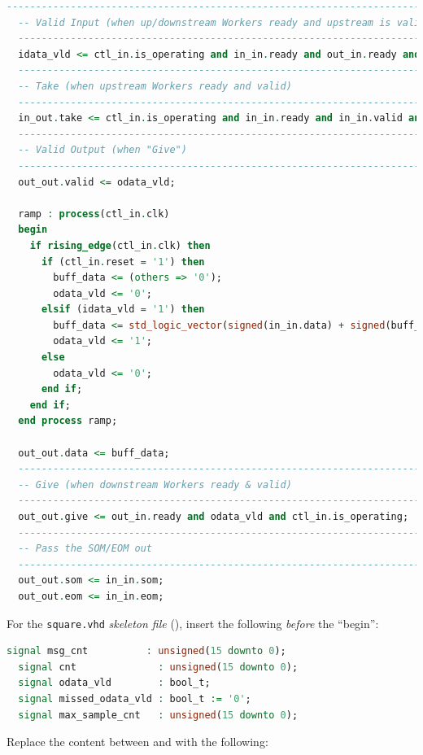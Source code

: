 \begin{lstlisting}[language=vhdl, columns=fullflexible, breaklines=true, prebreak=\textbackslash, basicstyle=\ttfamily, showstringspaces=false, upquote=true]
  -----------------------------------------------------------------------------
  -- Valid Input (when up/downstream Workers ready and upstream is valid
  -----------------------------------------------------------------------------
  idata_vld <= ctl_in.is_operating and in_in.ready and out_in.ready and in_in.valid;
  -----------------------------------------------------------------------------
  -- Take (when upstream Workers ready and valid)
  -----------------------------------------------------------------------------
  in_out.take <= ctl_in.is_operating and in_in.ready and in_in.valid and out_in.ready;
  -----------------------------------------------------------------------------
  -- Valid Output (when "Give")
  -----------------------------------------------------------------------------
  out_out.valid <= odata_vld;

  ramp : process(ctl_in.clk)
  begin
    if rising_edge(ctl_in.clk) then
      if (ctl_in.reset = '1') then
        buff_data <= (others => '0');
        odata_vld <= '0';
      elsif (idata_vld = '1') then
        buff_data <= std_logic_vector(signed(in_in.data) + signed(buff_data));
        odata_vld <= '1';
      else
        odata_vld <= '0';
      end if;
    end if;
  end process ramp;

  out_out.data <= buff_data;
  -----------------------------------------------------------------------------
  -- Give (when downstream Workers ready & valid)
  -----------------------------------------------------------------------------
  out_out.give <= out_in.ready and odata_vld and ctl_in.is_operating;
  -----------------------------------------------------------------------------
  -- Pass the SOM/EOM out
  -----------------------------------------------------------------------------
  out_out.som <= in_in.som;
  out_out.eom <= in_in.eom;
\end{lstlisting}

\bstart
For the \verb+square.vhd+ \textit{skeleton file} (), insert the following \textit{before} the ``begin'':
\begin{lstlisting}[language=vhdl, columns=fullflexible, breaklines=true, prebreak=\textbackslash, basicstyle=\ttfamily, showstringspaces=false, upquote=true]
  signal msg_cnt          : unsigned(15 downto 0);
  signal cnt              : unsigned(15 downto 0);
  signal odata_vld        : bool_t;
  signal missed_odata_vld : bool_t := '0';
  signal max_sample_cnt   : unsigned(15 downto 0);
\end{lstlisting}
\bend
\pagebreak[1]
Replace the content between  and  with the following:

